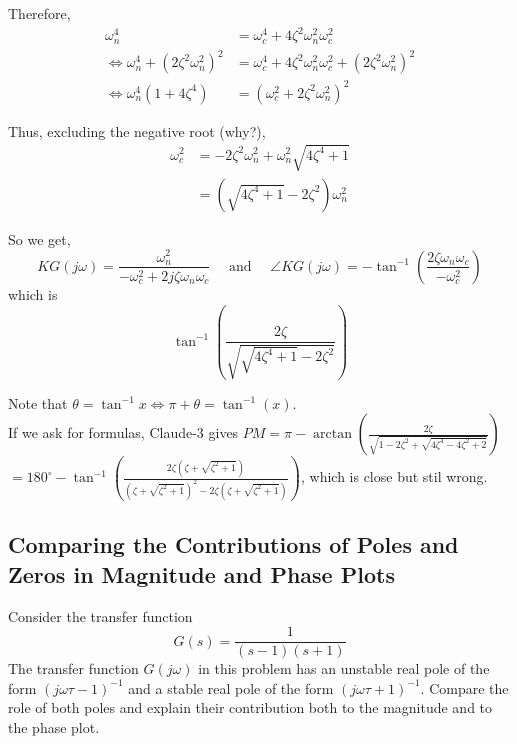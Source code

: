\documentclass[12pt]{article}
\begin{document}
\noindent  Therefore,
\begin{align}
\omega_n^4 & =\omega_c^4+4 \zeta^2 \omega_n^2 \omega_c^2  \nonumber  \nonumber  \\
\Leftrightarrow \omega_n^4+\left(2 \zeta^2 \omega_n^2\right)^2 & =\omega_c^4+4 \zeta^2 \omega_n^2 \omega_c^2+\left(2 \zeta^2 \omega_n^2\right)^2 \nonumber  \\
\Leftrightarrow \omega_n^4\left(1+4 \zeta^4\right) & =\left(\omega_c^2+2 \zeta^2 \omega_n^2\right)^2 \nonumber 
\end{align}

\noindent  Thus, excluding the negative root (why?),
$$
\begin{aligned}
\omega_c^2 & =-2 \zeta^2 \omega_n^2+\omega_n^2 \sqrt{4 \zeta^4+1} \nonumber  \\
& =\left(\sqrt{4 \zeta^4+1}-2 \zeta^2\right) \omega_n^2 \nonumber 
\end{aligned}
$$

\noindent  So we get,
$$ K G(j \omega)=\frac{\omega_n^2}{-\omega_c^2+2 j \zeta \omega_n \omega_c} \quad \text { and } \quad \angle K G(j \omega)=-\tan ^{-1}\left(\frac{2 \zeta \omega_n \omega_c}{-\omega_c^2}\right) $$
which is
$$ \tan ^{-1}\left(\frac{2 \zeta}{\sqrt{\sqrt{4 \zeta^4+1}-2 \zeta^2}}\right) $$

\noindent  Note that $\theta=\tan ^{-1} x \Longleftrightarrow \pi+\theta=\tan ^{-1}(x)$.\\


If we ask for formulas, 
Claude-3 gives $PM = \pi - \arctan\left(\frac{2\zeta}{\sqrt{1 - 2\zeta^2 + \sqrt{4\zeta^4 - 4\zeta^2 + 2}}}\right)$ $=180^\circ-\tan^{-1}\left(\frac{2 \zeta (\zeta+\sqrt{\zeta^2+1})}{(\zeta+\sqrt{\zeta^2+1})^2-2 \zeta (\zeta+\sqrt{\zeta^2+1})}\right)$, which is close but stil wrong. 
\clearpage

\subsection{Comparing the Contributions of Poles and Zeros in Magnitude and Phase Plots}

Consider the transfer function 
\[
G(s)=\frac{1}{(s - 1)(s+1)}
\]
The transfer function $G(j\omega)$ in this problem has an unstable real pole of the form $(j\omega \tau -1)^{-1}$ and a stable real pole of the form $(j\omega \tau + 1)^{-1}$. Compare the role of both poles and explain their contribution both to the magnitude and to the phase plot.\\ 
\end{document}
